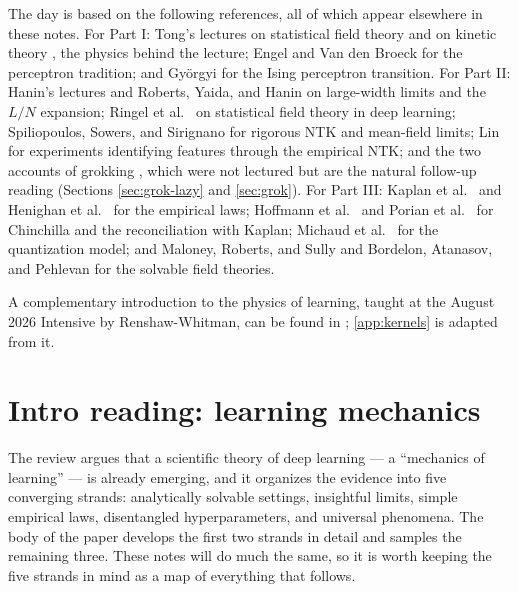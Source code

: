 \documentclass[11pt]{article}
\begin{document}
The day is based on the following references, all of which appear elsewhere in these notes. For Part I: Tong's lectures on statistical field theory and on kinetic theory \cite{TongSFT,TongKineticTheory}, the physics behind the lecture; Engel and Van den Broeck \cite{engel2001statistical} for the perceptron tradition; and Gy\"orgyi \cite{gyorgyi1990first} for the Ising perceptron transition. For Part II: Hanin's lectures \cite{hanin2026mdl} and Roberts, Yaida, and Hanin \cite{roberts2022principles} on large-width limits and the $L/N$ expansion; Ringel et al.\ \cite{ringel2025applications} on statistical field theory in deep learning; Spiliopoulos, Sowers, and Sirignano \cite{spiliopoulos2025foundations} for rigorous NTK and mean-field limits; Lin \cite{lin2025feature} for experiments identifying features through the empirical NTK; and the two accounts of grokking \cite{kumar2024grokking,rubin2024grokking}, which were not lectured but are the natural follow-up reading (Sections \ref{sec:grok-lazy} and \ref{sec:grok}). For Part III: Kaplan et al.\ \cite{kaplan2020scaling} and Henighan et al.\ \cite{henighan2020scaling} for the empirical laws; Hoffmann et al.\ \cite{hoffmann2022training} and Porian et al.\ \cite{porian2024resolving} for Chinchilla and the reconciliation with Kaplan; Michaud et al.\ \cite{michaud2023quantization} for the quantization model; and Maloney, Roberts, and Sully \cite{maloney2022solvable} and Bordelon, Atanasov, and Pehlevan \cite{bordelon2024dynamical} for the solvable field theories.

A complementary introduction to the physics of learning, taught at the August 2026 Intensive by Renshaw-Whitman, can be found in \cite{renshaw2026iliad}; \cref{app:kernels} is adapted from it.



\section{Intro reading: learning mechanics}
\label{sec:reading}

The review \cite{simon2026scientific} argues that a scientific theory of deep learning --- a ``mechanics of learning'' --- is already emerging, and it organizes the evidence into five converging strands: analytically solvable settings, insightful limits, simple empirical laws, disentangled hyperparameters, and universal phenomena. The body of the paper develops the first two strands in detail and samples the remaining three. These notes will do much the same, so it is worth keeping the five strands in mind as a map of everything that follows.
\end{document}
